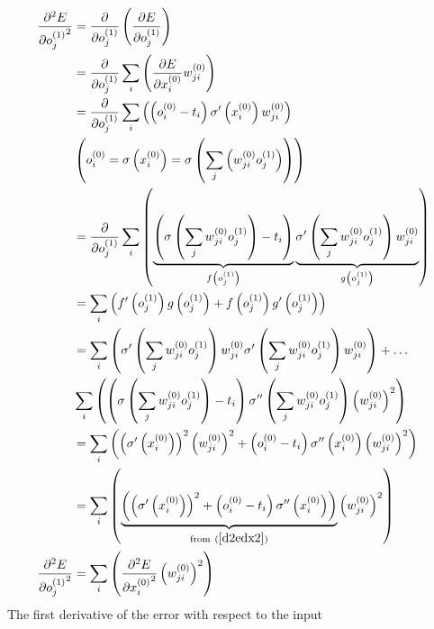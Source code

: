 \begin{align}
\pdv[2]{E}{{o_{j}^{(1)}}} &= 
\pdv{}{o_{j}^{(1)}}\left(
\pdv{E}{o_{j}^{(1)}}
\right)
\\
&= \pdv{}{o_{j}^{(1)}}
\sum_i\left(\pdv{E}{x_{i}^{(0)}}w_{ji}^{(0)}
\right)
\\
&= \pdv{}{o_{j}^{(1)}}
\sum_i\left(
\left(o_{i}^{(0)} - t_{i}\right)\sigma^{\prime}\left(x_{i}^{(0)}\right)w_{ji}^{(0)}
\right)
\\
&\left({o_{i}^{(0)}} = \sigma\left({x_{i}^{(0)}}\right) = \sigma\left(\sum_j\left({w_{ji}^{(0)}}{o_{j}^{(1)}}\right)\right)\right)
\\
&= \pdv{}{o_{j}^{(1)}}
\sum_i\left(
\underbrace{\left(\sigma\left(\sum_j{w_{ji}^{(0)}}{o_{j}^{(1)}}\right) - t_{i}\right)}
_{f\left(o_{j}^{(1)}\right)}
\underbrace{\sigma^{\prime}\left(\sum_j{w_{ji}^{(0)}}{o_{j}^{(1)}}\right)w_{ji}^{(0)}}
_{g\left(o_{j}^{(1)}\right)}
\right)
\\
&=\sum_i\left(f^{\prime}\left(o_{j}^{(1)}\right)g\left(o_{j}^{(1)}\right) + f\left(o_{j}^{(1)}\right)g^{\prime}\left(o_{j}^{(1)}\right)\right)
\\
&=\sum_i\left(
\sigma^{\prime}\left(\sum_j{w_{ji}^{(0)}}{o_{j}^{(1)}}\right)w_{ji}^{(0)}
\sigma^{\prime}\left(\sum_j{w_{ji}^{(0)}}{o_{j}^{(1)}}\right)w_{ji}^{(0)}
\right)
+ \ldots \\
&\sum_i\left(
\left(\sigma\left(\sum_j{w_{ji}^{(0)}}{o_{j}^{(1)}}\right) - t_{i}\right)
\sigma^{\prime\prime}\left(\sum_j{w_{ji}^{(0)}}{o_{j}^{(1)}}\right)\left(w_{ji}^{(0)}\right)^2
\right)
\\
&=
\sum_i\left(
\left(\sigma^{\prime}\left(x_{i}^{(0)}\right)\right)^2\left({w_{ji}^{(0)}}\right)^2
+ 
\left(o_{i}^{(0)} - t_{i}\right)
\sigma^{\prime\prime}\left(x_{i}^{(0)}\right)\left({w_{ji}^{(0)}}\right)^2
\right)
\\
&=\sum_i
\left(
\underbrace{\left(\left(\sigma^{\prime}\left(x_{i}^{(0)}\right)\right)^2
+ 
\left(o_{i}^{(0)} - t_{i}\right)
\sigma^{\prime\prime}\left(x_{i}^{(0)}\right)\right)}
_{\text{from} \ (\ref{d2edx2})}
\left({w_{ji}^{(0)}}\right)^2\right)
\\
\pdv[2]{E}{{o_{j}^{(1)}}} &= \sum_i\left(
\pdv[2]{E}{{x_{i}^{(0)}}} \left({w_{ji}^{(0)}}\right)^2
\right)
\end{align}
The first derivative of the error with respect to the input
%
